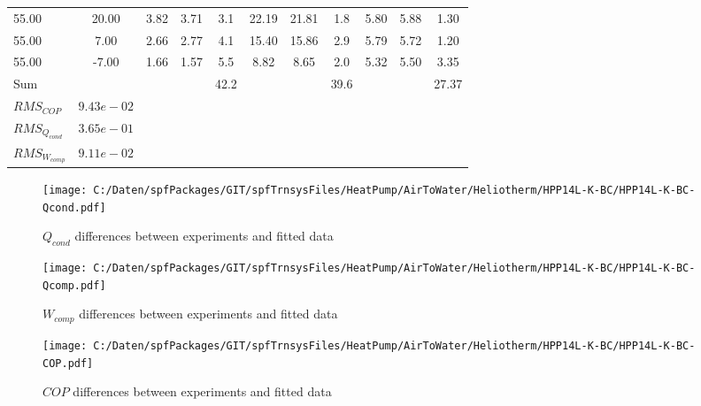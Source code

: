 \documentclass[english]{SPFShortReport}
\begin{document}
\begin{table}[!ht]
\begin{small}
\begin{center}
{\begin{tabular}{l | c c c c c c c c c c }
55.00  & 20.00 & 3.82 & 3.71 & 3.1 & 22.19 & 21.81 & 1.8 & 5.80 & 5.88 & 1.30\\ 
55.00  & 7.00 & 2.66 & 2.77 & 4.1 & 15.40 & 15.86 & 2.9 & 5.79 & 5.72 & 1.20\\ 
55.00  & -7.00 & 1.66 & 1.57 & 5.5 & 8.82 & 8.65 & 2.0 & 5.32 & 5.50 & 3.35\\ 
\hline 
 Sum &  & &  & 42.2 &  &  & 39.6 & &  & 27.37\\ 
\hline 
 $RMS_{COP}$ & $9.43e-02$ \\ 
 $RMS_{Q_{cond}}$ & $3.65e-01$ \\ 
 $RMS_{W_{comp}}$ & $9.11e-02$ \\ 
\hline
\hline
\end{tabular}
}
\label{ErrorsTable}
\end{center}
\end{small}
\end{table}
\begin{figure}[!ht]
\begin{center}
\texttt{[image: C:/Daten/spfPackages/GIT/spfTrnsysFiles/HeatPump/AirToWater/Heliotherm/HPP14L-K-BC/HPP14L-K-BC-Qcond.pdf]}
\caption{$Q_{cond}$ differences between experiments and fitted data}
\label{QcongFig}
\end{center}
\end{figure}
\begin{figure}[!ht]
\begin{center}
\texttt{[image: C:/Daten/spfPackages/GIT/spfTrnsysFiles/HeatPump/AirToWater/Heliotherm/HPP14L-K-BC/HPP14L-K-BC-Qcomp.pdf]}
\caption{$W_{comp}$ differences between experiments and fitted data}
\label{QcompFig}
\end{center}
\end{figure}
\begin{figure}[!ht]
\begin{center}
\texttt{[image: C:/Daten/spfPackages/GIT/spfTrnsysFiles/HeatPump/AirToWater/Heliotherm/HPP14L-K-BC/HPP14L-K-BC-COP.pdf]}
\caption{$COP$ differences between experiments and fitted data}
\label{COPFig}
\end{center}
\end{figure}
\end{document}
